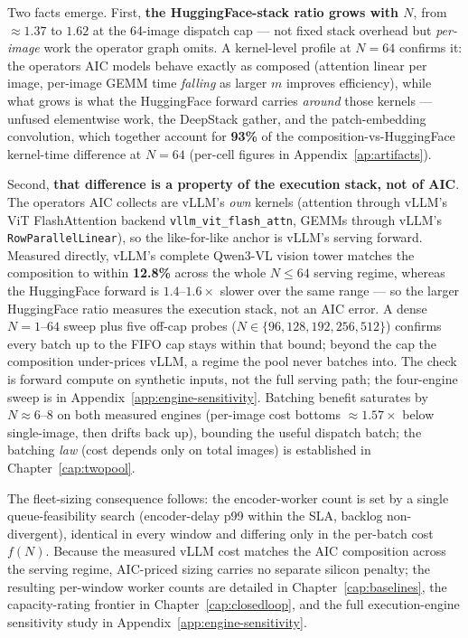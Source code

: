 Two facts emerge. First, \textbf{the HuggingFace-stack ratio grows with
$N$}, from ${\approx}1.37$ to $1.62$ at the 64-image dispatch cap --- not
fixed stack overhead but \emph{per-image} work the operator graph omits. A
kernel-level profile at $N{=}64$ confirms it: the operators AIC models
behave exactly as composed (attention linear per image, per-image GEMM time
\emph{falling} as larger $m$ improves efficiency), while what grows is what
the HuggingFace forward carries \emph{around} those kernels --- unfused
elementwise work, the DeepStack gather, and the patch-embedding
convolution, which together account for \textbf{93\%} of the
composition-vs-HuggingFace kernel-time difference at $N{=}64$ (per-cell
figures in Appendix~\ref{ap:artifacts}).

Second, \textbf{that difference is a property of the execution stack, not
of AIC}. The operators AIC collects are vLLM's \emph{own} kernels
(attention through vLLM's ViT FlashAttention backend
\texttt{vllm\_vit\_flash\_attn}, GEMMs through vLLM's
\texttt{RowParallelLinear}), so the like-for-like anchor is vLLM's serving
forward. Measured directly, vLLM's complete Qwen3-VL vision tower matches
the composition to within \textbf{12.8\%} across the whole $N\le64$ serving
regime, whereas the HuggingFace forward is $1.4$--$1.6\times$ slower over
the same range --- so the larger HuggingFace ratio measures the execution
stack, not an AIC error. A dense $N{=}1$--$64$ sweep plus five off-cap
probes ($N\in\{96,128,192,256,512\}$) confirms every batch
up to the FIFO cap stays within that bound; beyond the cap the composition
under-prices vLLM, a regime the pool never batches into. The check is
forward compute on synthetic inputs, not the full serving path; the
four-engine sweep is in Appendix~\ref{app:engine-sensitivity}. Batching
benefit saturates by $N{\approx}6$--$8$ on both measured engines (per-image cost
bottoms ${\approx}1.57\times$ below single-image, then drifts back up),
bounding the useful dispatch batch; the batching \emph{law} (cost depends
only on total images) is established in Chapter~\ref{cap:twopool}.

The fleet-sizing consequence follows: the encoder-worker count is set by a
single queue-feasibility search (encoder-delay p99 within the SLA, backlog
non-divergent), identical in every window and differing only in the
per-batch cost $f(N)$. Because the measured vLLM cost matches the AIC
composition across the serving regime, AIC-priced sizing carries no
separate silicon penalty; the resulting per-window worker counts are
detailed in Chapter~\ref{cap:baselines}, the capacity-rating frontier in
Chapter~\ref{cap:closedloop}, and the full execution-engine
sensitivity study in Appendix~\ref{app:engine-sensitivity}.

